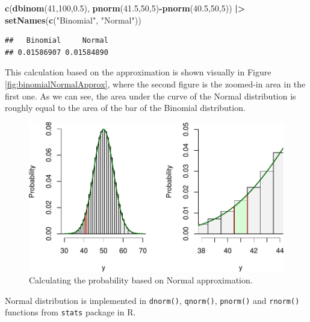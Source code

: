 \documentclass[
]{book}
\newenvironment{Shaded}{\begin{snugshade}}{\end{snugshade}}
\newcommand{\DecValTok}[1]{\textcolor[rgb]{0.00,0.00,0.81}{#1}}
\newcommand{\ErrorTok}[1]{\textcolor[rgb]{0.64,0.00,0.00}{\textbf{#1}}}
\newcommand{\FloatTok}[1]{\textcolor[rgb]{0.00,0.00,0.81}{#1}}
\newcommand{\KeywordTok}[1]{\textcolor[rgb]{0.13,0.29,0.53}{\textbf{#1}}}
\newcommand{\NormalTok}[1]{#1}
\newcommand{\OperatorTok}[1]{\textcolor[rgb]{0.81,0.36,0.00}{\textbf{#1}}}
\newcommand{\StringTok}[1]{\textcolor[rgb]{0.31,0.60,0.02}{#1}}
\theoremstyle{definition}
\theoremstyle{definition}
\theoremstyle{definition}
\theoremstyle{definition}
\theoremstyle{remark}
\begin{document}
\begin{Shaded}
\begin{Highlighting}[]
\KeywordTok{c}\NormalTok{(}\KeywordTok{dbinom}\NormalTok{(}\DecValTok{41}\NormalTok{,}\DecValTok{100}\NormalTok{,}\FloatTok{0.5}\NormalTok{),}
  \KeywordTok{pnorm}\NormalTok{(}\FloatTok{41.5}\NormalTok{,}\DecValTok{50}\NormalTok{,}\DecValTok{5}\NormalTok{)}\OperatorTok{{-}}\KeywordTok{pnorm}\NormalTok{(}\FloatTok{40.5}\NormalTok{,}\DecValTok{50}\NormalTok{,}\DecValTok{5}\NormalTok{)) }\OperatorTok{|}\ErrorTok{\textgreater{}}
\StringTok{    }\KeywordTok{setNames}\NormalTok{(}\KeywordTok{c}\NormalTok{(}\StringTok{"Binomial"}\NormalTok{, }\StringTok{"Normal"}\NormalTok{))}
\end{Highlighting}
\end{Shaded}

\begin{verbatim}
##   Binomial     Normal 
## 0.01586907 0.01584890
\end{verbatim}

This calculation based on the approximation is shown visually in Figure \ref{fig:binomialNormalApprox}, where the second figure is the zoomed-in area in the first one. As we can see, the area under the curve of the Normal distribution is roughly equal to the area of the bar of the Binomial distribution.

\begin{figure}
\centering
\includegraphics{Svetunkov---Statistics-for-Business-Analytics_files/figure-latex/binomialNormalApproxArea-1.pdf}
\caption{\label{fig:binomialNormalApproxArea}Calculating the probability based on Normal approximation.}
\end{figure}

Normal distribution is implemented in \texttt{dnorm()}, \texttt{qnorm()}, \texttt{pnorm()} and \texttt{rnorm()} functions from \texttt{stats} package in R.
\end{document}
